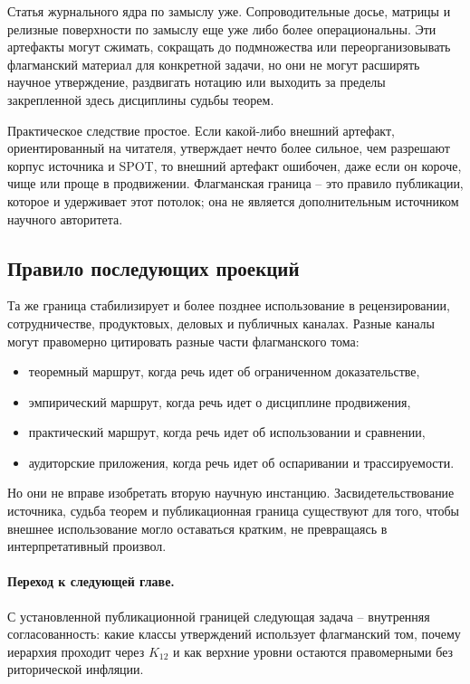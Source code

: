 Статья журнального ядра по замыслу уже. Сопроводительные досье, матрицы и
релизные поверхности по замыслу еще уже либо более операциональны. Эти
артефакты могут сжимать, сокращать до подмножества или переорганизовывать
флагманский материал для конкретной задачи, но они не могут расширять научное
утверждение, раздвигать нотацию или выходить за пределы закрепленной здесь
дисциплины судьбы теорем.

Практическое следствие простое. Если какой-либо внешний артефакт,
ориентированный на читателя, утверждает нечто более сильное, чем разрешают
корпус источника и SPOT, то внешний артефакт ошибочен, даже если он короче,
чище или проще в продвижении. Флагманская граница -- это правило публикации,
которое и удерживает этот потолок; она не является дополнительным источником
научного авторитета.

\subsection{Правило последующих проекций}

Та же граница стабилизирует и более позднее использование в рецензировании,
сотрудничестве, продуктовых, деловых и публичных каналах. Разные каналы могут
правомерно цитировать разные части флагманского тома:

\begin{itemize}
\item теоремный маршрут, когда речь идет об ограниченном доказательстве,
\item эмпирический маршрут, когда речь идет о дисциплине продвижения,
\item практический маршрут, когда речь идет об использовании и сравнении,
\item аудиторские приложения, когда речь идет об оспаривании и
      трассируемости.
\end{itemize}

Но они не вправе изобретать вторую научную инстанцию. Засвидетельствование
источника, судьба теорем и публикационная граница существуют для того, чтобы
внешнее использование могло оставаться кратким, не превращаясь в
интерпретативный произвол.

\paragraph{Переход к следующей главе.}
С установленной публикационной границей следующая задача -- внутренняя
согласованность: какие классы утверждений использует флагманский том, почему
иерархия проходит через \(K_{12}\) и как верхние уровни остаются правомерными
без риторической инфляции.

